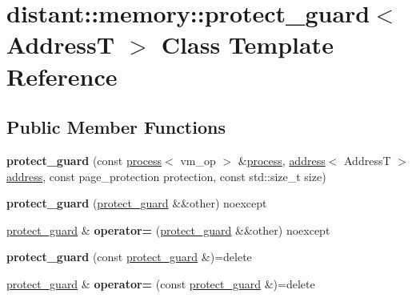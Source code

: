 \hypertarget{classdistant_1_1memory_1_1protect__guard}{}\section{distant\+:\+:memory\+:\+:protect\+\_\+guard$<$ AddressT $>$ Class Template Reference}
\label{classdistant_1_1memory_1_1protect__guard}
\subsection*{Public Member Functions}
\begin{DoxyCompactItemize}
\item 
\mbox{\label{classdistant_1_1memory_1_1protect__guard_a3abb6c24847c5526428c9b3347c1f09a}} 
{\bfseries protect\+\_\+guard} (const \mbox{\hyperlink{classdistant_1_1kernel__objects_1_1process}{process}}$<$ vm\+\_\+op $>$ \&\mbox{\hyperlink{classdistant_1_1kernel__objects_1_1process}{process}}, \mbox{\hyperlink{classdistant_1_1memory_1_1address}{address}}$<$ AddressT $>$ \mbox{\hyperlink{classdistant_1_1memory_1_1address}{address}}, const page\+\_\+protection protection, const std\+::size\+\_\+t size)
\item 
\mbox{\label{classdistant_1_1memory_1_1protect__guard_ad898a35c595b9fb3805a0c05dddf4566}} 
{\bfseries protect\+\_\+guard} (\mbox{\hyperlink{classdistant_1_1memory_1_1protect__guard}{protect\+\_\+guard}} \&\&other) noexcept
\item 
\mbox{\label{classdistant_1_1memory_1_1protect__guard_a86dbbc606beea50f0c7030b2ab9ff05d}} 
\mbox{\hyperlink{classdistant_1_1memory_1_1protect__guard}{protect\+\_\+guard}} \& {\bfseries operator=} (\mbox{\hyperlink{classdistant_1_1memory_1_1protect__guard}{protect\+\_\+guard}} \&\&other) noexcept
\item 
\mbox{\label{classdistant_1_1memory_1_1protect__guard_ae467c34caab9d706b0f2ffdc5270492e}} 
{\bfseries protect\+\_\+guard} (const \mbox{\hyperlink{classdistant_1_1memory_1_1protect__guard}{protect\+\_\+guard}} \&)=delete
\item 
\mbox{\label{classdistant_1_1memory_1_1protect__guard_ab1f7defcd0c60ab53eeb7cdf6f02192b}} 
\mbox{\hyperlink{classdistant_1_1memory_1_1protect__guard}{protect\+\_\+guard}} \& {\bfseries operator=} (const \mbox{\hyperlink{classdistant_1_1memory_1_1protect__guard}{protect\+\_\+guard}} \&)=delete
\end{DoxyCompactItemize}



